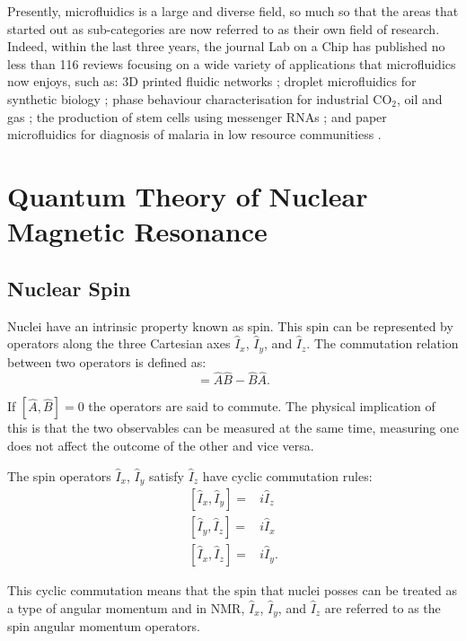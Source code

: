 Presently, microfluidics is a large and diverse field, so much so that the areas that started out as sub-categories are now referred to as their
own field of research. Indeed, within the last three years, the journal Lab on a Chip has published no less than 116 reviews focusing on a wide variety of applications
that microfluidics now enjoys, such as: 3D printed fluidic networks \citep{kinstlinger20163d}; droplet microfluidics for synthetic biology \citep{gach2017droplet};
phase behaviour characterisation for industrial CO$_2$, oil and gas \citep{bao2017microfluidic}; the production of stem cells using messenger RNAs \citep{giulitti2019direct};
and paper microfluidics for diagnosis of malaria in low resource communitiess \citep{reboud2019based}.

\newpage

\section{Quantum Theory of Nuclear Magnetic Resonance}\label{Quantum}

\subsection{Nuclear Spin}\label{Spin}

Nuclei have an intrinsic property known as spin. This spin can be represented by operators
along the three Cartesian axes $\hat{I}_x$, $\hat{I}_y$, and $\hat{I}_z$.
The commutation relation between two operators is defined as:
\begin{equation}
  [\hat{A},\hat{B}] = \hat{A}\hat{B} - \hat{B}\hat{A}.
\end{equation}

If $[\hat{A},\hat{B}] = 0$ the operators are said to commute. The physical implication
of this is that the two observables can be measured at the same time, measuring one
does not affect the outcome of the other and vice versa.

The spin operators $\hat{I}_x$, $\hat{I}_y$ satisfy $\hat{I}_z$
have cyclic commutation rules:
\begin{align}\label{eqn:commutator}
  [\hat{I}_x,\hat{I}_y] =& i\hat{I}_z\\
  [\hat{I}_y,\hat{I}_z] =& i\hat{I}_x\\
  [\hat{I}_x,\hat{I}_z] =& i\hat{I}_y.
\end{align}

This cyclic commutation means that the spin that nuclei posses can be treated as a
type of angular momentum and in NMR, $\hat{I}_x$, $\hat{I}_y$, and $\hat{I}_z$ are
referred to as the spin angular momentum operators.


